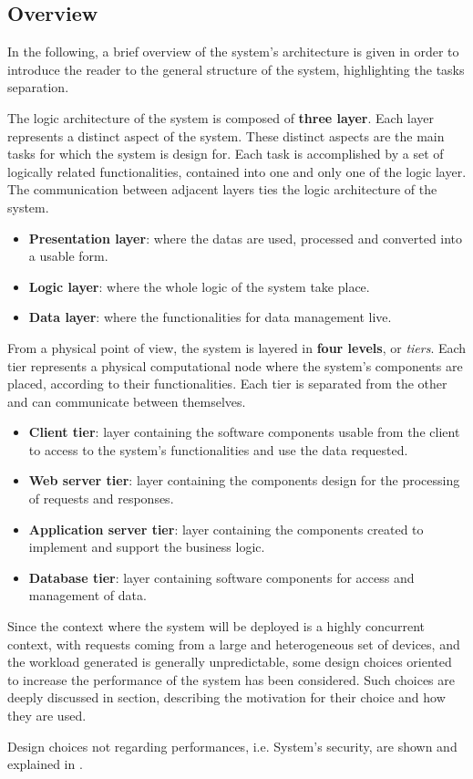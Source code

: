 \subsection{Overview}

In the following, a brief overview of the system's architecture is given in order to introduce the reader to the general structure of the system, highlighting the tasks separation.

The logic architecture of the system is composed of \textbf{three layer}. Each layer represents a distinct aspect of the system. These distinct aspects are the main tasks for which the system is design for. Each task is accomplished by a set of logically related functionalities, contained into one and only one of the logic layer. The communication between adjacent layers ties the logic architecture of the system. 

\begin{itemize}
	\item \textbf{Presentation layer}: where the datas are used, processed and converted into a usable form.
	\item \textbf{Logic layer}: where the whole logic of the system take place.
	\item \textbf{Data layer}: where the functionalities for data management live.
\end{itemize}

From a physical point of view, the system is layered in \textbf{four levels}, or \textit{tiers}. Each tier represents a physical computational node where the system's components are placed, according to their functionalities. Each tier is separated from the other and can communicate between themselves.

\begin{itemize}
	\item \textbf{Client tier}: layer containing the software components usable from the client to access to the system's functionalities and use the data requested.
	\item \textbf{Web server tier}: layer containing the components design for the processing of requests and responses.
	\item \textbf{Application server tier}: layer containing the components created to implement and support the business logic.
	\item \textbf{Database tier}: layer containing software components for access and management of data.
\end{itemize}

Since the context where the system will be deployed is a highly concurrent context, with requests coming from a large and heterogeneous set of devices, and the workload generated is generally unpredictable, some design choices oriented to increase the performance of the system has been considered.
Such choices are deeply discussed in \textit{} section, describing the motivation for their choice and how they are used.

Design choices not regarding performances, i.e. System's security, are shown and explained in \textit{}.
